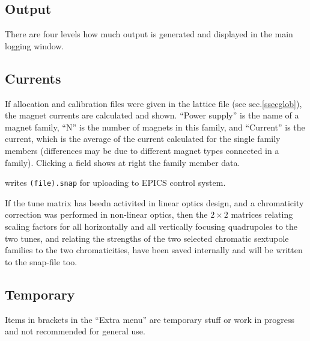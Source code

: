 \documentclass[12pt]{article}
\newcommand\button[1]{\fbox{\small\bf #1}}
\begin{document}
\subsection{Output}
There are four levels how much output is generated and displayed in the main logging window. 

\subsection{\label{sseccur}Currents}
If allocation and calibration files were given in the lattice
file (see sec.\ref{ssecglob}), the magnet currents are calculated and shown.
``Power supply'' is the name of a magnet family, ``N'' is the number of magnets
in this family, and ``Current'' is the current, which is the average of
the current calculated for the single family members (differences may
be due to different magnet types connected in a family).
Clicking a field shows at right the family member data.

\button{Snap export} writes {\tt (file).snap} for uploading to EPICS control system.

If the tune matrix has beedn activited in linear optics design, and a chromaticity correction was performed in non-linear optics, then the $2\times 2$ matrices relating scaling factors for all horizontally and all vertically focusing quadrupoles to the two tunes, and relating the strengths of the two selected chromatic sextupole families to the two chromaticities, have been saved internally and will be written to the snap-file too.

\subsection{Temporary}
Items in brackets in the ``Extra menu'' are temporary stuff or work in progress and not recommended for general use.
\end{document}
